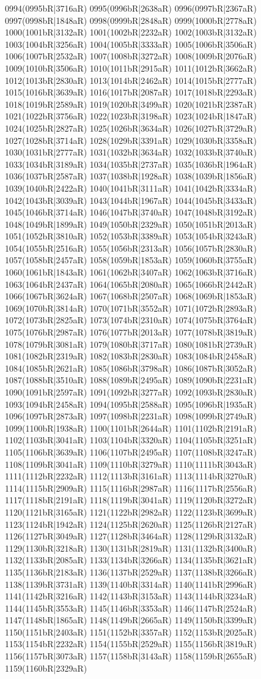 0994(0995bR|3716aR) 0995(0996bR|2638aR) 0996(0997bR|2367aR) 0997(0998bR|1848aR) 0998(0999bR|2848aR) 0999(1000bR|2778aR) 1000(1001bR|3132aR) 1001(1002bR|2232aR) 1002(1003bR|3132aR) 1003(1004bR|3256aR) 1004(1005bR|3333aR) 1005(1006bR|3506aR) 1006(1007bR|2532aR) 1007(1008bR|3272aR) 1008(1009bR|2076aR) 1009(1010bR|3506aR) 1010(1011bR|2915aR) 1011(1012bR|3662aR) 1012(1013bR|2830aR) 1013(1014bR|2462aR) 1014(1015bR|2777aR) 1015(1016bR|3639aR) 1016(1017bR|2087aR) 1017(1018bR|2293aR) 1018(1019bR|2589aR) 1019(1020bR|3499aR) 1020(1021bR|2387aR) 1021(1022bR|3756aR) 1022(1023bR|3198aR) 1023(1024bR|1847aR) 1024(1025bR|2827aR) 1025(1026bR|3634aR) 1026(1027bR|3729aR) 1027(1028bR|3714aR) 1028(1029bR|3391aR) 1029(1030bR|3358aR) 1030(1031bR|2777aR) 1031(1032bR|3634aR) 1032(1033bR|3740aR) 1033(1034bR|3189aR) 1034(1035bR|2737aR) 1035(1036bR|1964aR) 1036(1037bR|2587aR) 1037(1038bR|1928aR) 1038(1039bR|1856aR) 1039(1040bR|2422aR) 1040(1041bR|3111aR) 1041(1042bR|3334aR) 1042(1043bR|3039aR) 1043(1044bR|1967aR) 1044(1045bR|3433aR) 1045(1046bR|3714aR) 1046(1047bR|3740aR) 1047(1048bR|3192aR) 1048(1049bR|1899aR) 1049(1050bR|2329aR) 1050(1051bR|2013aR) 1051(1052bR|3810aR) 1052(1053bR|3389aR) 1053(1054bR|3243aR) 1054(1055bR|2516aR) 1055(1056bR|2313aR) 1056(1057bR|2830aR) 1057(1058bR|2457aR) 1058(1059bR|1853aR) 1059(1060bR|3755aR) 1060(1061bR|1843aR) 1061(1062bR|3407aR) 1062(1063bR|3716aR) 1063(1064bR|2437aR) 1064(1065bR|2080aR) 1065(1066bR|2442aR) 1066(1067bR|3624aR) 1067(1068bR|2507aR) 1068(1069bR|1853aR) 1069(1070bR|3814aR) 1070(1071bR|3552aR) 1071(1072bR|2893aR) 1072(1073bR|2825aR) 1073(1074bR|2310aR) 1074(1075bR|3764aR) 1075(1076bR|2987aR) 1076(1077bR|2013aR) 1077(1078bR|3819aR) 1078(1079bR|3081aR) 1079(1080bR|3717aR) 1080(1081bR|2739aR) 1081(1082bR|2319aR) 1082(1083bR|2830aR) 1083(1084bR|2458aR) 1084(1085bR|2621aR) 1085(1086bR|3798aR) 1086(1087bR|3052aR) 1087(1088bR|3510aR) 1088(1089bR|2495aR) 1089(1090bR|2231aR) 1090(1091bR|2597aR) 1091(1092bR|3277aR) 1092(1093bR|2830aR) 1093(1094bR|2458aR) 1094(1095bR|2588aR) 1095(1096bR|1935aR) 1096(1097bR|2873aR) 1097(1098bR|2231aR) 1098(1099bR|2749aR) 1099(1100bR|1938aR) 1100(1101bR|2644aR) 1101(1102bR|2191aR) 1102(1103bR|3041aR) 1103(1104bR|3320aR) 1104(1105bR|3251aR) 1105(1106bR|3639aR) 1106(1107bR|2495aR) 1107(1108bR|3247aR) 1108(1109bR|3041aR) 1109(1110bR|3279aR) 1110(1111bR|3043aR) 1111(1112bR|2232aR) 1112(1113bR|3161aR) 1113(1114bR|3270aR) 1114(1115bR|2909aR) 1115(1116bR|2987aR) 1116(1117bR|2556aR) 1117(1118bR|2191aR) 1118(1119bR|3041aR) 1119(1120bR|3272aR) 1120(1121bR|3165aR) 1121(1122bR|2982aR) 1122(1123bR|3699aR) 1123(1124bR|1942aR) 1124(1125bR|2620aR) 1125(1126bR|2127aR) 1126(1127bR|3049aR) 1127(1128bR|3464aR) 1128(1129bR|3132aR) 1129(1130bR|3218aR) 1130(1131bR|2819aR) 1131(1132bR|3400aR) 1132(1133bR|2085aR) 1133(1134bR|3266aR) 1134(1135bR|3621aR) 1135(1136bR|2183aR) 1136(1137bR|2529aR) 1137(1138bR|3266aR) 1138(1139bR|3731aR) 1139(1140bR|3314aR) 1140(1141bR|2996aR) 1141(1142bR|3216aR) 1142(1143bR|3153aR) 1143(1144bR|3234aR) 1144(1145bR|3553aR) 1145(1146bR|3353aR) 1146(1147bR|2524aR) 1147(1148bR|1865aR) 1148(1149bR|2665aR) 1149(1150bR|3399aR) 1150(1151bR|2403aR) 1151(1152bR|3357aR) 1152(1153bR|2025aR) 1153(1154bR|2232aR) 1154(1155bR|2529aR) 1155(1156bR|3819aR) 1156(1157bR|3073aR) 1157(1158bR|3143aR) 1158(1159bR|2655aR) 1159(1160bR|2329aR) 